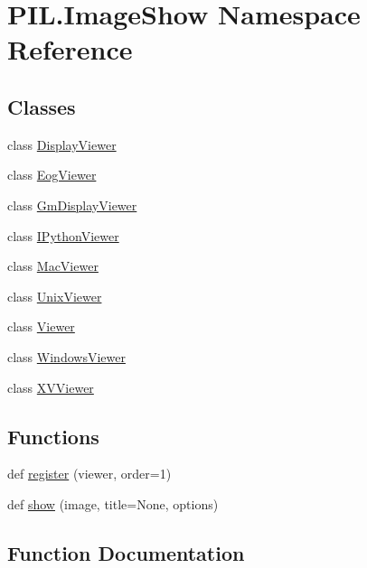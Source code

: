 \hypertarget{namespacePIL_1_1ImageShow}{}\section{P\+I\+L.\+Image\+Show Namespace Reference}
\label{namespacePIL_1_1ImageShow}
\subsection*{Classes}
\begin{DoxyCompactItemize}
\item 
class \hyperlink{classPIL_1_1ImageShow_1_1DisplayViewer}{Display\+Viewer}
\item 
class \hyperlink{classPIL_1_1ImageShow_1_1EogViewer}{Eog\+Viewer}
\item 
class \hyperlink{classPIL_1_1ImageShow_1_1GmDisplayViewer}{Gm\+Display\+Viewer}
\item 
class \hyperlink{classPIL_1_1ImageShow_1_1IPythonViewer}{I\+Python\+Viewer}
\item 
class \hyperlink{classPIL_1_1ImageShow_1_1MacViewer}{Mac\+Viewer}
\item 
class \hyperlink{classPIL_1_1ImageShow_1_1UnixViewer}{Unix\+Viewer}
\item 
class \hyperlink{classPIL_1_1ImageShow_1_1Viewer}{Viewer}
\item 
class \hyperlink{classPIL_1_1ImageShow_1_1WindowsViewer}{Windows\+Viewer}
\item 
class \hyperlink{classPIL_1_1ImageShow_1_1XVViewer}{X\+V\+Viewer}
\end{DoxyCompactItemize}
\subsection*{Functions}
\begin{DoxyCompactItemize}
\item 
def \hyperlink{namespacePIL_1_1ImageShow_a2fac49d6e0d96a6fb71079fbf4061523}{register} (viewer, order=1)
\item 
def \hyperlink{namespacePIL_1_1ImageShow_a746ccb433ccf0b7865ccdd8c1b6e82b5}{show} (image, title=None, options)
\end{DoxyCompactItemize}


\subsection{Function Documentation}
\mbox{\label{namespacePIL_1_1ImageShow_a2fac49d6e0d96a6fb71079fbf4061523}} 
